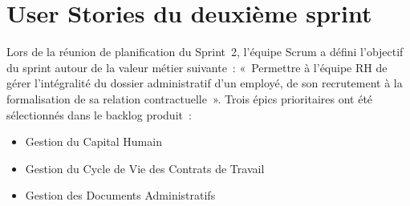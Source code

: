 \section{User Stories du deuxième sprint}
\label{sec:s2-userstories}

Lors de la réunion de planification du Sprint~2, l'équipe Scrum a défini
l'objectif du sprint autour de la valeur métier suivante~: «~Permettre à
l'équipe RH de gérer l'intégralité du dossier administratif d'un employé,
de son recrutement à la formalisation de sa relation contractuelle~». Trois
épics prioritaires ont été sélectionnés dans le backlog produit~:

\begin{itemize}[label=\textbullet, leftmargin=0.6cm]
    \item Gestion du Capital Humain
    \item Gestion du Cycle de Vie des Contrats de Travail
    \item Gestion des Documents Administratifs
\end{itemize}

